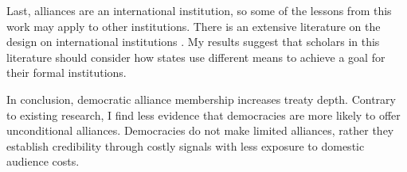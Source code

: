 \documentclass[12pt]{article}
\begin{document}
Last, alliances are an international institution, so some of the lessons from this work may apply to other institutions. 
There is an extensive literature on the design on international institutions \citep{DownesRocke1995, MartinSimmons1998, Koremenosetal2001, Koremenos2005, Thompson2010}.
My results suggest that scholars in this literature should consider how states use different means to achieve a goal for their formal institutions. 


In conclusion, democratic alliance membership increases treaty depth. 
Contrary to existing research, I find less evidence that democracies are more likely to offer unconditional alliances. 
Democracies do not make limited alliances, rather they establish credibility through costly signals with less exposure to domestic audience costs. 



\singlespace
 
 
\end{document}
